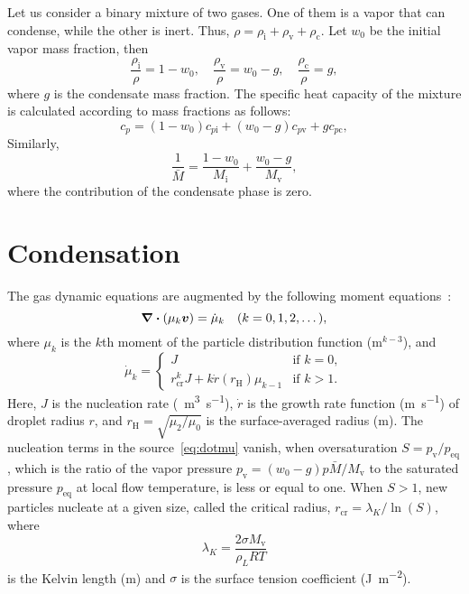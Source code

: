 \documentclass{article}
\newcommand{\vap}{\text{v}}
\newcommand{\ine}{\text{i}}
\newcommand{\con}{\text{c}}
\newcommand{\eq}{\text{eq}}
\newcommand{\crit}[2][]{#2_\text{cr#1}}
\newcommand{\Hill}{\text{H}}
\newcommand{\bv}{\vb*{v}}
\begin{document}
Let us consider a binary mixture of two gases.
One of them is a vapor that can condense, while the other is inert.
Thus, $\rho = \rho_\ine + \rho_\vap + \rho_\con$.
Let $w_0$ be the initial vapor mass fraction, then
\begin{equation}\label{eq:rhoM}
    \frac{\rho_\ine}{\rho} = 1-w_0, \quad \frac{\rho_\vap}{\rho} = w_0-g, \quad \frac{\rho_\con}{\rho} = g,
\end{equation}
where $g$ is the condensate mass fraction.
The specific heat capacity of the mixture is calculated according to mass fractions as follows:
\begin{equation}\label{eq:c_p}
    c_p = (1-w_0)c_{p\ine} + (w_0-g)c_{p\vap} + gc_{p\con},
\end{equation}
Similarly,
\begin{equation}\label{eq:M}
    \frac1{\bar{M}} = \frac{1-w_0}{M_\ine} + \frac{w_0-g}{M_\vap},
\end{equation}
where the contribution of the condensate phase is zero.

\section{Condensation}

The gas dynamic equations are augmented by the following moment equations~\cite{hill1966condensation}:
\begin{equation}\label{eq:mu_k}
    \div(\mu_k\bv) = \dot{\mu}_k \quad (k=0,1,2,\dots),
\end{equation}
where $\mu_k$ is the $k$th moment of the particle distribution function ($\si{\m}^{k-3}$), and
\begin{equation}\label{eq:dotmu}
    \dot\mu_k = \begin{cases}
        J &\text{if } k=0,\\
        \crit{r}^{k}J + k\dot{r}(r_\Hill)\mu_{k-1} &\text{if } k>1.
    \end{cases}
\end{equation}
Here, $J$ is the nucleation rate (\si{\per\cubic\m\per\s}),
$\dot{r}$ is the growth rate function (\si{\m\per\s}) of droplet radius $r$,
and $r_\Hill=\sqrt{\mu_2/\mu_0}$ is the surface-averaged radius (\si{\m}).
The nucleation terms in the source~\eqref{eq:dotmu} vanish, when oversaturation $S = p_\vap/p_\eq$,
which is the ratio of the vapor pressure $p_\vap = (w_0 - g)p\bar{M}/M_\vap$
to the saturated pressure $p_\eq$ at local flow temperature, is less or equal to one.
When $S>1$, new particles nucleate at a given size,
called the critical radius, $\crit{r} = \lambda_K/\ln(S)$, where
\begin{equation}\label{eq:Kelvin}
    \lambda_K = \frac{2\sigma M_\vap}{\rho_L R T}
\end{equation}
is the Kelvin length (\si{m}) and $\sigma$ is the surface tension coefficient (\si{\J\per\square\m}).
\end{document}
